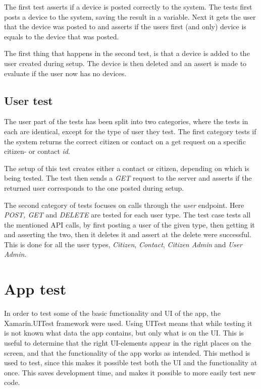 The first test asserts if a device is posted correctly to the system. The tests first posts a device to the system, saving the result in a variable. Next it gets the user that the device was posted to and asserts if the users first (and only) device is equals to the device that was posted.

The first thing that happens in the second test, is that a device is added to the user created during setup. The device is then deleted and an assert is made to evaluate if the user now has no devices.

\subsection{User test}
The user part of the tests has been split into two categories, where the tests in each are identical, except for the type of user they test. The first category tests if the system returns the correct citizen or contact on a get request on a specific citizen- or contact \textit{id}.

The setup of this test creates either a contact or citizen, depending on which is being tested. The test then sends a \textit{GET} request to the server and asserts if the returned user corresponds to the one posted during setup.

The second category of tests focuses on calls through the \textit{user} endpoint. Here \textit{POST, GET} and \textit{DELETE} are tested for each user type. The test case tests all the mentioned API calls, by first posting a user of the given type, then getting it and asserting the two, then it deletes it and assert at the delete were successful. This is done for all the user types, \textit{Citizen}, \textit{Contact}, \textit{Citizen Admin} and \textit{User Admin}.

\section{App test}
\label{sec:appTest}
In order to test some of the basic functionality and UI of the app, the Xamarin.UITest framework were used. Using UITest means that while testing it is not known what data the app contains, but only what is on the UI. This is useful to determine that the right UI-elements appear in the right places on the screen, and that the functionality of the app works as intended. This method is used to test, since this makes it possible test both the UI and the functionality at once. This saves development time, and makes it possible to more easily test new code.

